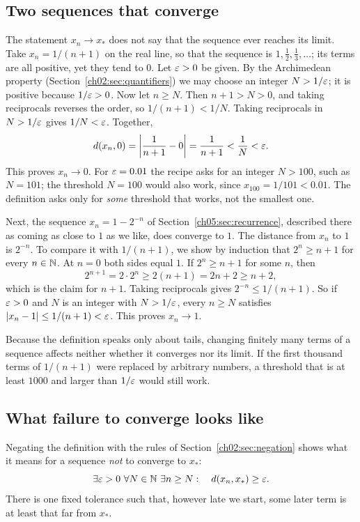 \subsection*{Two sequences that converge}
The statement $x_n\to x_*$ does not say that the sequence ever reaches its limit. Take $x_n=1/(n+1)$ on the real line, so that the sequence is $1,\tfrac12,\tfrac13,\ldots$; its terms are all positive, yet they tend to $0$. Let $\varepsilon>0$ be given. By the Archimedean property (Section~\ref{ch02:sec:quantifiers}) we may choose an integer $N>1/\varepsilon$; it is positive because $1/\varepsilon>0$. Now let $n\ge N$. Then $n+1>N>0$, and taking reciprocals reverses the order, so $1/(n+1)<1/N$. Taking reciprocals in $N>1/\varepsilon$ gives $1/N<\varepsilon$. Together,
\[
d(x_n,0)=\left|\frac1{n+1}-0\right|=\frac1{n+1}<\frac1N<\varepsilon.
\]
This proves $x_n\to0$. For $\varepsilon=0.01$ the recipe asks for an integer $N>100$, such as $N=101$; the threshold $N=100$ would also work, since $x_{100}=1/101<0.01$. The definition asks only for \emph{some} threshold that works, not the smallest one.

Next, the sequence $x_n=1-2^{-n}$ of Section~\ref{ch05:sec:recurrence}, described there as coming as close to $1$ as we like, does converge to $1$. The distance from $x_n$ to $1$ is $2^{-n}$. To compare it with $1/(n+1)$, we show by induction that $2^n\ge n+1$ for every $n\in\mathbb N$. At $n=0$ both sides equal $1$. If $2^n\ge n+1$ for some $n$, then
\[
2^{n+1}=2\cdot2^n\ge2(n+1)=2n+2\ge n+2,
\]
which is the claim for $n+1$. Taking reciprocals gives $2^{-n}\le1/(n+1)$. So if $\varepsilon>0$ and $N$ is an integer with $N>1/\varepsilon$, every $n\ge N$ satisfies $|x_n-1|\le1/(n+1)<\varepsilon$. This proves $x_n\to1$.

Because the definition speaks only about tails, changing finitely many terms of a sequence affects neither whether it converges nor its limit. If the first thousand terms of $1/(n+1)$ were replaced by arbitrary numbers, a threshold that is at least $1000$ and larger than $1/\varepsilon$ would still work.

\subsection*{What failure to converge looks like}
Negating the definition with the rules of Section~\ref{ch02:sec:negation} shows what it means for a sequence \emph{not} to converge to $x_*$:
\[
\exists\varepsilon>0\ \forall N\in\mathbb N\ \exists n\ge N:\quad d(x_n,x_*)\ge\varepsilon.
\]
There is one fixed tolerance such that, however late we start, some later term is at least that far from $x_*$.


